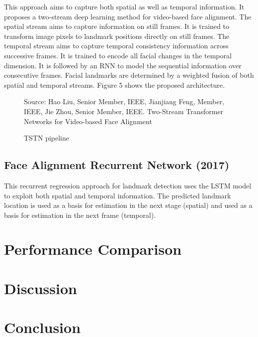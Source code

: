\documentclass{llncs}
\begin{document}
This approach aims to capture both spatial as well as temporal information. It proposes a two-stream deep learning method for video-based face alignment. The spatial stream aims to capture information on still frames. It is trained to transform image pixels to landmark positions directly on still frames. The temporal stream aims to capture temporal consistency information across successive frames. It is trained to encode all facial changes in the temporal dimension. It is followed by an RNN to model the sequential information over consecutive frames. Facial landmarks are determined by a weighted fusion of both spatial and temporal streams. Figure 5 shows the proposed architecture.

\begin{figure}
%
{Source: Hao Liu, Senior Member, IEEE, Jianjiang Feng, Member, IEEE, Jie Zhou, Senior Member, IEEE. Two-Stream Transformer Networks for Video-based Face Alignment}
\caption{TSTN pipeline}
\end{figure}

\subsection{Face Alignment Recurrent Network (2017)}

This recurrent regression approach for landmark detection uses the LSTM model to exploit both spatial and temporal information. The predicted landmark location is used as a basis for estimation in the next stage (spatial) and used as a basis for estimation in the next frame (temporal).





\section{Performance Comparison}


\section{Discussion}


\section{Conclusion}


%

%
%


%
\end{document}
